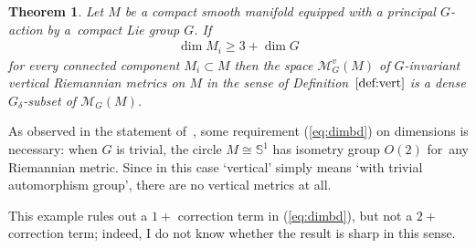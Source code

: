 \documentclass[10pt,a4paper]{amsart}
\numberwithin{equation}{section}
\newtheorem{Theorem}{Theorem}[section]
\begin{document}
\begin{Theorem}\label{th:equirig}
 Let $M$ be a compact smooth manifold equipped with a principal $G$-action by a~compact Lie group $G$. If
 \begin{gather}\label{eq:dimbd}
 \dim M_i\ge 3+\dim G
 \end{gather}
 for every connected component $M_i\subset M$ then the space $\mathcal{M}^v_G(M)$ of $G$-invariant vertical Riemannian metrics on $M$ in the sense of Definition~$\ref{def:vert}$ is a dense $G_{\delta}$-subset of $\mathcal{M}_G(M)$.
\end{Theorem}

\begin{Remark}%
 As observed in the statement of~\cite[Proposition~8.3]{eb}, some requirement (\ref{eq:dimbd}) on dimensions is necessary: when $G$ is trivial, the circle $M\cong \mathbb{S}^1$ has isometry group $O(2)$ for~any Riemannian metric. Since in this case `vertical' simply means `with trivial automorphism group', there are no vertical metrics at all.

 This example rules out a $1+$ correction term in (\ref{eq:dimbd}), but not a $2+$ correction term; indeed, I do not know whether the result is sharp in this sense.
\end{Remark}
\end{document}
